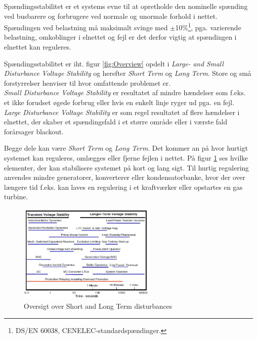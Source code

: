 
\label{Spaendingsstabilitet}

Spændingsstabilitet er et systems evne til at opretholde den nominelle spænding ved busbarere og forbrugere ved normale og unormale forhold i nettet. Spændingen ved belastning må maksimalt svinge med $\pm$10\%\footnote{DS/EN 60038, CENELEC-standardspændinger.}, pga. varierende belastning, omkoblinger i elnettet og fejl er det derfor vigtig at spændingen i elnettet kan reguleres.

Spændingsstabilitet er iht. figur \ref{fig:Overview} opdelt i \textit{Large- and Small Disturbance Voltage Stability} og herefter \textit{Short Term} og \textit{Long Term}. Store og små forstyrrelser henviser til hvor omfattende problemet er. \\
\textit{Small Disturbance Voltage Stability} er resultatet af mindre hændelser som f.eks. et ikke forudset øgede forbrug eller hvis en enkelt linje ryger ud pga. en fejl.\\
\textit{Large Disturbance Voltage Stability} er som regel resultatet af flere hændelser i elnettet, der skaber et spændingsfald i et større område eller i værste fald forårsager blackout.

Begge dele kan være \textit{Short Term} og \textit{Long Term}. Det kommer an på hvor hurtigt systemet kan reguleres, omlægges eller fjerne fejlen i nettet. På figur \ref{fig:VoltageTime} ses hvilke elementer, der kan stabilisere systemet på kort og lang sigt. Til hurtig regulering anvendes mindre generatorer, konverterer eller kondensatorbanke, hvor der over længere tid f.eks. kan laves en regulering i et kraftværker eller opstartes en gas turbine.  

\begin{figure}[H] %
	\centering
	\includegraphics[width=0.6\textwidth]{figurer/Voltage_time}
	\caption{Oversigt over Short and Long Term disturbances}
	\label{fig:VoltageTime}
\end{figure}

